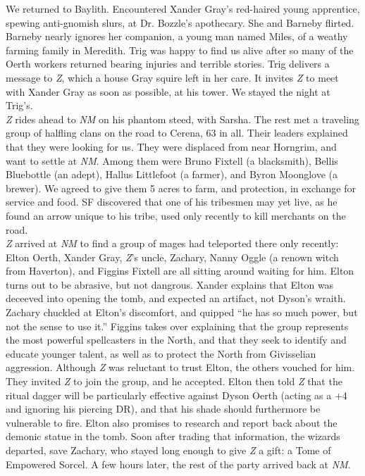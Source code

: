\documentclass[letterpaper]{article}
\begin{document}
\noindent We returned to Baylith.  Encountered Xander Gray's red-haired young apprentice, spewing anti-gnomish slurs, at Dr. Bozzle's apothecary.  She and Barneby flirted.  Barneby nearly ignores her companion, a young man named Miles, of a weathy farming family in Meredith. Trig was happy to find us alive after so many of the Oerth workers returned bearing injuries and terrible stories.  Trig delivers a message to \emph{Z}, which a house Gray squire left in her care.  It invites \emph{Z} to meet with Xander Gray as soon as possible, at his tower.  We stayed the night at Trig's.\\

\noindent \emph{Z} rides ahead to \emph{NM} on his phantom steed, with Sarsha. The rest met a traveling group of halfling clans on the road to Cerena, 63 in all. Their leaders explained that they were looking for us.  They were displaced from near Horngrim, and want to settle at \emph{NM}.  Among them were Bruno Fixtell (a blacksmith), Bellis Bluebottle (an adept), Hallus Littlefoot (a farmer), and Byron Moonglove (a brewer).  We agreed to give them 5 acres to farm, and protection, in exchange for service and food.  SF discovered that one of his tribesmen may yet live, as he found an arrow unique to his tribe, used only recently to kill merchants on the road.\\

\noindent \emph{Z} arrived at \emph{NM} to find a group of mages had teleported there only recently: Elton Oerth, Xander Gray, \emph{Z}'s uncle, Zachary, Nanny Oggle (a renown witch from Haverton), and Figgins Fixtell are all sitting around waiting for him. Elton turns out to be abrasive, but not dangrous. Xander explains that Elton was deceeved into opening the tomb, and expected an artifact, not Dyson's wraith.  Zachary chuckled at Elton's discomfort, and quipped ``he has so much power, but not the sense to use it.'' Figgins takes over explaining that the group represents the most powerful spellcasters in the North, and that they seek to identify and educate younger talent, as well as to protect the North from Givisselian aggression.  Although \emph{Z} was reluctant to trust Elton, the others vouched for him.  They invited \emph{Z} to join the group, and he accepted.  Elton then told \emph{Z} that the ritual dagger will be particularly effective against Dyson Oerth (acting as a +4 and ignoring his piercing DR), and that his shade should furthermore be vulnerable to fire.  Elton also promises to research and report back about the demonic statue in the tomb.  Soon after trading that information, the wizards departed, save Zachary, who stayed long enough to give \emph{Z} a gift: a Tome of Empowered Sorcel.  A few hours later, the rest of the party arrived back at \emph{NM}. \\
\end{document}
